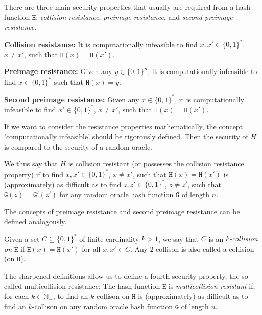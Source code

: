 \documentclass[submission,copyright,creativecommons]{eptcs}
\newcommand{\N}{\mathbb N}
\newcommand{\h}{\mathtt H}
\newcommand{\g}{\mathtt G}
\begin{document}
There are three main security properties that usually are required from a hash function $\h$: \textit{collision resistance}, \textit{preimage resistance}, and \textit{second preimage resistance}.

\textbf{Collision resistance:} It is computationally infeasible to find $x,x'\in\{0,1\}^\ast$, $x\neq x'$, such that $\h(x)=\h(x')$.

\textbf{Preimage resistance:} Given any $y\in\{0,1\}^n$, it is computationally infeasible to find $x\in\{0,1\}^\ast$ such that $\h(x)=y$.

\textbf{Second preimage resistance:} Given any $x\in\{0,1\}^\ast$, it is computationally infeasible to find $x'\in\{0,1\}^\ast$, $x\neq x'$, such that $\h(x)=\h(x')$.

If we want to consider the resistance properties mathematically, the concept 'computationally infeasible' should be rigorously defined. Then the security of $H$ is compared to the security of a random oracle. 

We thus say that $H$ is collision resistant (or possesses the collision resistance property) if to find $x,x'\in\{0,1\}^\ast$, $x\neq x'$, such that $\h(x)=\h(x')$ is (approximately) as difficult as to find $z,z'\in\{0,1\}^\ast$, $z\neq z'$, such that $\g(z)=\g'(z')$ for any random oracle hash function $\g$ of length $n$.

The concepts of preimage resistance and second preimage resistance can be defined analogously. 

Given a set $C\subseteq\{0,1\}^\ast$ of finite cardinality $k>1$, we say that $C$ is an \textit{$k$-collision on $\h$} if $\h(x)=\h(x')$ for all $x,x'\in C$.  Any $2$-collison is also called a collision (on $\h$). 

The sharpened definitions allow us to define a fourth security property, the so called multicollision resistance: The hash function $\h$ is \textit{multicollision resistant} if, for each $k\in\N_+$, to find an $k$-collison on $\h$ is (approximately) as difficult as to find an $k$-collison on any random oracle hash function $\g$ of length $n$.
\end{document}
